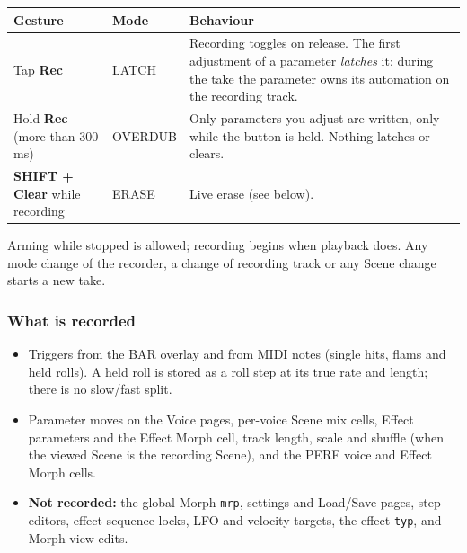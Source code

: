 {\def\LTcaptype{none} %
\begin{longtable}[]{@{}
  >{\raggedright\arraybackslash}p{}
  >{\raggedright\arraybackslash}p{}
  >{\raggedright\arraybackslash}p{}@{}}
\toprule\noalign{}
\begin{minipage}[b]{\linewidth}\raggedright
Gesture
\end{minipage} & \begin{minipage}[b]{\linewidth}\raggedright
Mode
\end{minipage} & \begin{minipage}[b]{\linewidth}\raggedright
Behaviour
\end{minipage} \\
\midrule\noalign{}
\endhead
\bottomrule\noalign{}
\endlastfoot
Tap \textbf{Rec} & LATCH & Recording toggles on release. The first
adjustment of a parameter \emph{latches} it: during the take the
parameter owns its automation on the recording track. \\
Hold \textbf{Rec} (more than 300 ms) & OVERDUB & Only parameters you
adjust are written, only while the button is held. Nothing latches or
clears. \\
\textbf{SHIFT + Clear} while recording & ERASE & Live erase (see
below). \\
\end{longtable}
}

Arming while stopped is allowed; recording begins when playback does.
Any mode change of the recorder, a change of recording track or any
Scene change starts a new take.

\subsubsection{What is recorded}\label{what-is-recorded}

\begin{itemize}
\tightlist
\item
  Triggers from the BAR overlay and from MIDI notes (single hits, flams
  and held rolls). A held roll is stored as a roll step at its true rate
  and length; there is no slow/fast split.
\item
  Parameter moves on the Voice pages, per-voice Scene mix cells, Effect
  parameters and the Effect Morph cell, track length, scale and shuffle
  (when the viewed Scene is the recording Scene), and the PERF voice and
  Effect Morph cells.
\item
  \textbf{Not recorded:} the global Morph \texttt{mrp}, settings and
  Load/Save pages, step editors, effect sequence locks, LFO and velocity
  targets, the effect \texttt{typ}, and Morph-view edits.
\end{itemize}

